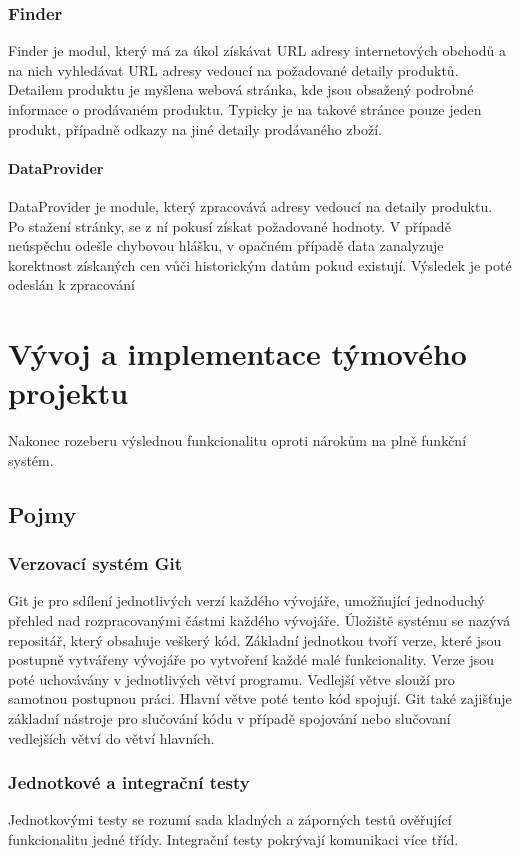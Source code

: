 \documentclass[thesis=B,czech]{FITthesis}[2012/06/26]
\begin{document}
\subsection{Finder}
Finder je modul, který má za úkol získávat URL adresy internetových obchodů a na nich vyhledávat URL adresy vedoucí na požadované detaily produktů.
Detailem produktu je myšlena webová stránka, kde jsou obsažený podrobné informace o prodávaném produktu. Typicky je na takové stránce pouze jeden
produkt, případně odkazy na jiné detaily prodávaného zboží.
\subsubsection{DataProvider}
DataProvider je module, který zpracovává adresy vedoucí na detaily produktu. Po stažení stránky, se z ní pokusí získat požadované
hodnoty. V případě neúspěchu odešle chybovou hlášku, v opačném případě data zanalyzuje korektnost získaných cen vůči historickým datům pokud
existují. Výsledek je poté odeslán k zpracování  

\chapter{Vývoj a implementace týmového projektu}

Nakonec rozeberu výslednou funkcionalitu oproti nárokům na plně funkční systém.
\section{Pojmy}

\subsection{Verzovací systém Git}
Git je pro sdílení jednotlivých verzí každého vývojáře, umožňující jednoduchý přehled nad rozpracovanými částmi každého vývojáře.
Úložiště systému se nazývá repositář, který obsahuje veškerý kód.
Základní jednotkou tvoří verze, které jsou postupně vytvářeny vývojáře po vytvoření každé malé funkcionality.
Verze jsou poté uchovávány v jednotlivých větví programu. Vedlejší větve slouží pro samotnou postupnou práci. 
Hlavní větve poté tento kód spojují.
Git také zajišťuje základní nástroje pro slučování kódu v případě spojování nebo slučovaní vedlejších větví do větví hlavních.
\subsection{Jednotkové a integrační testy}
Jednotkovými testy se rozumí sada kladných a záporných testů ověřující funkcionalitu jedné třídy.
Integrační testy pokrývají komunikaci více tříd.
\end{document}
